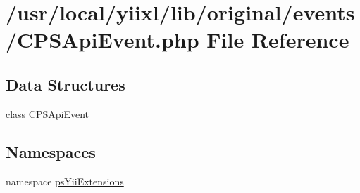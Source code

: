 \hypertarget{CPSApiEvent_8php}{
\section{/usr/local/yiixl/lib/original/events/CPSApiEvent.php File Reference}
\label{CPSApiEvent_8php}
}
\subsection*{Data Structures}
\begin{DoxyCompactItemize}
\item 
class \hyperlink{classCPSApiEvent}{CPSApiEvent}
\end{DoxyCompactItemize}
\subsection*{Namespaces}
\begin{DoxyCompactItemize}
\item 
namespace \hyperlink{namespacepsYiiExtensions}{psYiiExtensions}
\end{DoxyCompactItemize}
